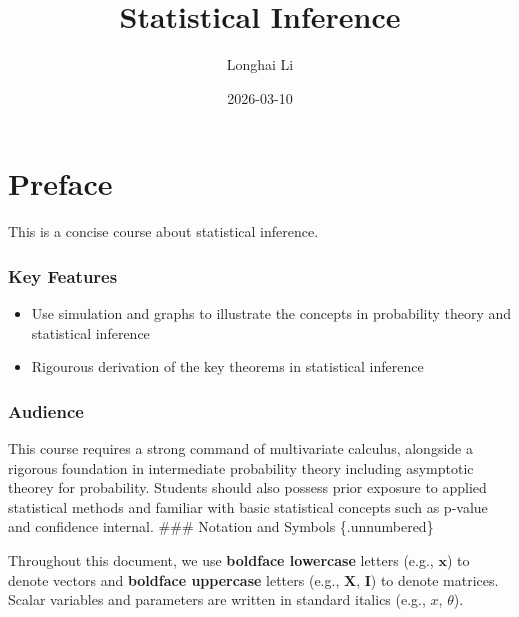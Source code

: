 \documentclass[
  letterpaper,
  DIV=11,
  numbers=noendperiod]{scrreprt}
\title{Statistical Inference}
\author{Longhai Li}
\date{2026-03-10}
\providecommand{\tightlist}{%
  \setlength{\itemsep}{0pt}\setlength{\parskip}{0pt}}
\renewcommand{\[}{\begin{equation}}
\renewcommand{\]}{\end{equation}}
\theoremstyle{definition}
\theoremstyle{plain}
\theoremstyle{plain}
\theoremstyle{plain}
\theoremstyle{definition}
\theoremstyle{plain}
\theoremstyle{remark}
\begin{document}
\maketitle



\chapter*{Preface}\label{preface}


This is a concise course about statistical inference.

\subsection*{Key Features}\label{key-features}

\begin{itemize}
\tightlist
\item
  Use simulation and graphs to illustrate the concepts in probability
  theory and statistical inference
\item
  Rigourous derivation of the key theorems in statistical inference
\end{itemize}

\subsection*{Audience}\label{audience}

This course requires a strong command of multivariate calculus,
alongside a rigorous foundation in intermediate probability theory
including asymptotic theorey for probability. Students should also
possess prior exposure to applied statistical methods and familiar with
basic statistical concepts such as p-value and confidence internal.
\#\#\# Notation and Symbols \{.unnumbered\}

Throughout this document, we use \textbf{boldface lowercase} letters
(e.g., \(\mathbf{x}\)) to denote vectors and \textbf{boldface uppercase}
letters (e.g., \(\mathbf{X}\), \(\mathbf{I}\)) to denote matrices.
Scalar variables and parameters are written in standard italics (e.g.,
\(x\), \(\theta\)).
\end{document}
